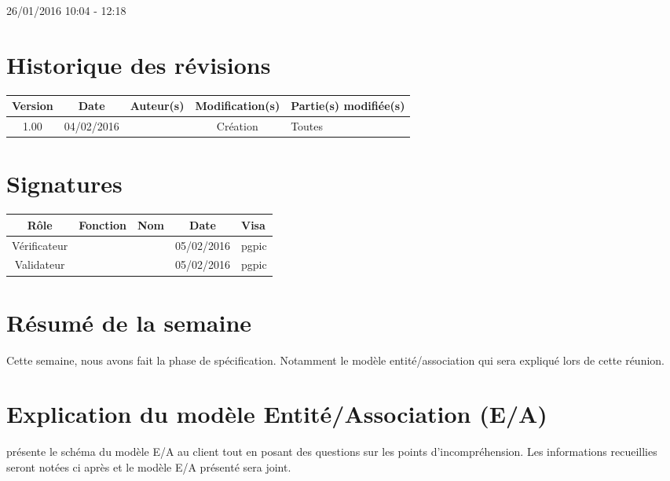 \documentclass [a4paper] {article}
\begin{document}
26/01/2016			 				%
\hfill   
\hfill 	 10:04 - 12:18 				%


\section*{Historique des révisions}
\begin{center}
			\begin{tabular}{| c | c | c | c | p{4cm} |}
				\hline
				\rowcolor{Gray}
				Version & Date & Auteur(s) & Modification(s) & Partie(s) modifiée(s)		 \\
				\hline
				1.00 & 04/02/2016 & \Pierre & Création & Toutes \\
		\hline		
			\end{tabular}
		\end{center}

\section*{Signatures}

		\begin{center}
			\begin{tabular}{| c | c | c | c | p{4cm} |}
				\hline
				\rowcolor{Gray}
				Rôle & Fonction & Nom & Date & Visa		 \\
				\hline
				Vérificateur & \RQA & \Kafui & 05/02/2016 & pgpic \\[30pt]
				\hline
				Validateur & \CP & \Sergi & 05/02/2016 & pgpic \\[30pt]	
				\hline
			\end{tabular}
		\end{center}


\section{Résumé de la semaine}
Cette semaine, nous avons fait la phase de spécification. Notamment le modèle entité/association qui sera expliqué lors de cette réunion.


\section{Explication du modèle Entité/Association (E/A)}
\Julie présente le schéma du modèle E/A au client tout en posant des questions sur les points d'incompréhension. Les informations recueillies seront notées ci après et le modèle E/A présenté sera joint.
\\
\end{document}
